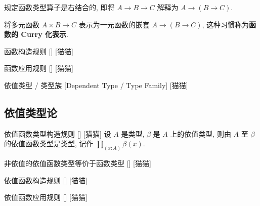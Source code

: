 \documentclass[UTF8]{ctexart}
\begin{document}
        \begin{rmk}
            [猫猫]
            规定函数类型算子是右结合的, 即将 \(A \to B \to C\) 解释为 \(A \to (B \to C)\). 
        \end{rmk}
        
        \begin{rmk}
            [猫猫]
            将多元函数 \(A\times B\to C\) 表示为一元函数的嵌套 \(A\to (B\to C)\), 这种习惯称为\textbf{函数的 Curry 化表示}. 
        \end{rmk}
        
        \begin{axm}
            []
            {函数构造规则}
            []
            [猫猫]
        \end{axm}
        
        \begin{axm}
            []
            {函数应用规则}
            []
            [猫猫]
        \end{axm}
        
        \begin{dfn}
            {依值类型 / 类型族}
            [Dependent Type / Type Family]
            [猫猫]
        \end{dfn}
        

    \subsection{依值类型论}
        
        \begin{axm}
            []
            {依值函数类型构造规则}
            []
            [猫猫]
            设 \(A\) 是类型, \(\beta\) 是 \(A\) 上的依值类型, 则由 \(A\) 至 \(\beta\) 的依值函数类型是类型, 记作 \(\prod_{(x:A)} \beta(x)\). 
        \end{axm}
        
        \begin{ppt}
            []
            {非依值的依值函数类型等价于函数类型}
            []
            [猫猫]
        \end{ppt}

        \begin{axm}
            []
            {依值函数构造规则}
            []
            [猫猫]
        \end{axm}

        \begin{axm}
            []
            {依值函数应用规则}
            []
            [猫猫]
        \end{axm}

    
\end{document}
